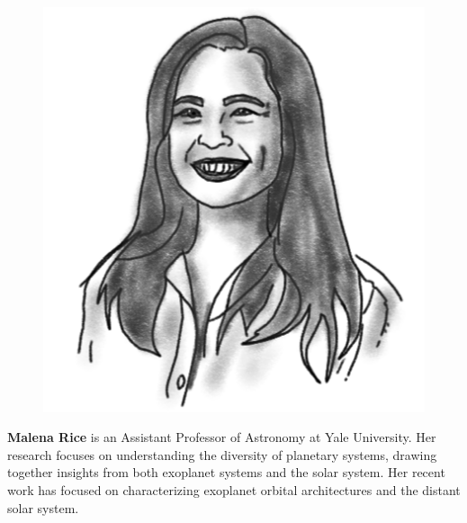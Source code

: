 \begin{figure}
\vspace{-\intextsep}
\includegraphics[width=0.9\linewidth]{portraits/malena.png}
\end{figure}
\textbf{Malena Rice} is an Assistant Professor of Astronomy at Yale University. Her research focuses on understanding the diversity of planetary systems, drawing together insights from both exoplanet systems and the solar system. Her recent work has focused on characterizing exoplanet orbital architectures and the distant solar system. \\
\\

